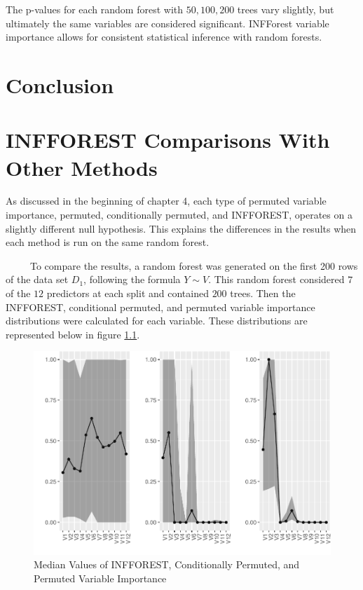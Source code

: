 \documentclass[12pt,twoside]{reedthesis}
\begin{document}
  The p-values for each random forest with \(50,100,200\) trees vary
  slightly, but ultimately the same variables are considered significant.
  INFForest variable importance allows for consistent statistical
  inference with random forests.
  
  \chapter*{Conclusion}\label{conclusion}
  
  \setcounter{chapter}{4} \setcounter{section}{0}
  
  \chapter{INFFOREST Comparisons With Other
  Methods}\label{infforest-comparisons-with-other-methods}
  
  As discussed in the beginning of chapter 4, each type of permuted
  variable importance, permuted, conditionally permuted, and INFFOREST,
  operates on a slightly different null hypothesis. This explains the
  differences in the results when each method is run on the same random
  forest.
  
  ~~~~~To compare the results, a random forest was generated on the first
  200 rows of the data set \(D_1\), following the formula \(Y \sim V\).
  This random forest considered \(7\) of the \(12\) predictors at each
  split and contained \(200\) trees. Then the INFFOREST, conditional
  permuted, and permuted variable importance distributions were calculated
  for each variable. These distributions are represented below in figure
  \ref{fig:figcomparisons}.
  
  \begin{figure}[htbp]
  \centering
  \includegraphics{Thesis_files/figure-latex/figcomparisons-1.pdf}
  \caption{\label{fig:figcomparisons}Median Values of INFFOREST, Conditionally
  Permuted, and Permuted Variable Importance}
  \end{figure}
  
\end{document}
